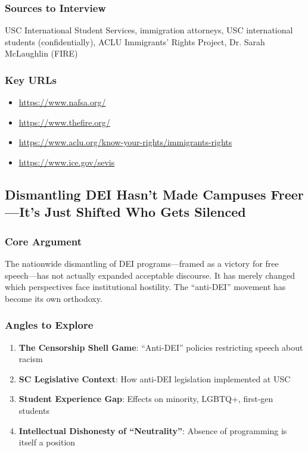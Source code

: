 \documentclass[11pt,letterpaper]{article}
\begin{document}
\subsubsection*{Sources to Interview}
USC International Student Services, immigration attorneys, USC international students (confidentially), ACLU Immigrants' Rights Project, Dr. Sarah McLaughlin (FIRE)

\subsubsection*{Key URLs}
\begin{itemize}[noitemsep]
    \item \url{https://www.nafsa.org/}
    \item \url{https://www.thefire.org/}
    \item \url{https://www.aclu.org/know-your-rights/immigrants-rights}
    \item \url{https://www.ice.gov/sevis}
\end{itemize}

\newpage
\subsection{Dismantling DEI Hasn't Made Campuses Freer---It's Just Shifted Who Gets Silenced}

\subsubsection*{Core Argument}
The nationwide dismantling of DEI programs---framed as a victory for free speech---has not actually expanded acceptable discourse. It has merely changed which perspectives face institutional hostility. The ``anti-DEI'' movement has become its own orthodoxy.

\subsubsection*{Angles to Explore}
\begin{enumerate}[noitemsep]
    \item \textbf{The Censorship Shell Game}: ``Anti-DEI'' policies restricting speech about racism
    \item \textbf{SC Legislative Context}: How anti-DEI legislation implemented at USC
    \item \textbf{Student Experience Gap}: Effects on minority, LGBTQ+, first-gen students
    \item \textbf{Intellectual Dishonesty of ``Neutrality''}: Absence of programming is itself a position
\end{enumerate}
\end{document}
